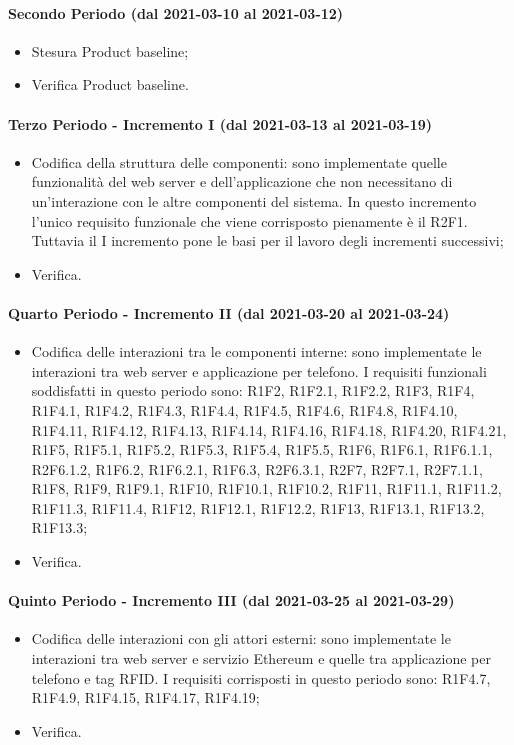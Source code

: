 \paragraph{Secondo Periodo (dal 2021-03-10 al 2021-03-12)}
\begin{itemize}
	\item Stesura Product baseline;
	\item Verifica Product baseline.
\end{itemize}

\paragraph{Terzo Periodo - Incremento I (dal 2021-03-13 al 2021-03-19)}
\begin{itemize}
	\item Codifica della struttura delle componenti: sono implementate quelle funzionalità del web server e dell'applicazione che non necessitano di un'interazione con le altre componenti del sistema. In questo incremento l'unico requisito funzionale che viene corrisposto pienamente è il R2F1. Tuttavia il I incremento pone le basi per il lavoro degli incrementi successivi;
	\item Verifica.
\end{itemize}

\paragraph{Quarto Periodo - Incremento II (dal 2021-03-20 al 2021-03-24)}
\begin{itemize}
	\item  Codifica delle interazioni tra le componenti interne: sono implementate le interazioni tra web server e applicazione per telefono. I requisiti funzionali soddisfatti in questo periodo sono: R1F2, R1F2.1, R1F2.2, R1F3, R1F4, R1F4.1, R1F4.2, R1F4.3, R1F4.4, R1F4.5, R1F4.6, R1F4.8, R1F4.10, R1F4.11, R1F4.12, R1F4.13, R1F4.14, R1F4.16, R1F4.18, R1F4.20, R1F4.21, R1F5, R1F5.1, R1F5.2, R1F5.3, R1F5.4, R1F5.5, R1F6, R1F6.1, R1F6.1.1, R2F6.1.2, R1F6.2, R1F6.2.1, R1F6.3, R2F6.3.1, R2F7, R2F7.1, R2F7.1.1, R1F8, R1F9, R1F9.1, R1F10, R1F10.1, R1F10.2, R1F11, R1F11.1, R1F11.2, R1F11.3, R1F11.4, R1F12, R1F12.1, R1F12.2, R1F13, R1F13.1, R1F13.2, R1F13.3;
	\item Verifica.
\end{itemize}

\paragraph{Quinto Periodo - Incremento III (dal 2021-03-25 al 2021-03-29)}
\begin{itemize}
	\item Codifica delle interazioni con gli attori esterni: sono implementate le interazioni tra web server e servizio Ethereum e quelle tra applicazione per telefono e tag RFID.
	I requisiti corrisposti in questo periodo sono: R1F4.7, R1F4.9, R1F4.15, R1F4.17, R1F4.19;
	\item Verifica.
\end{itemize}

